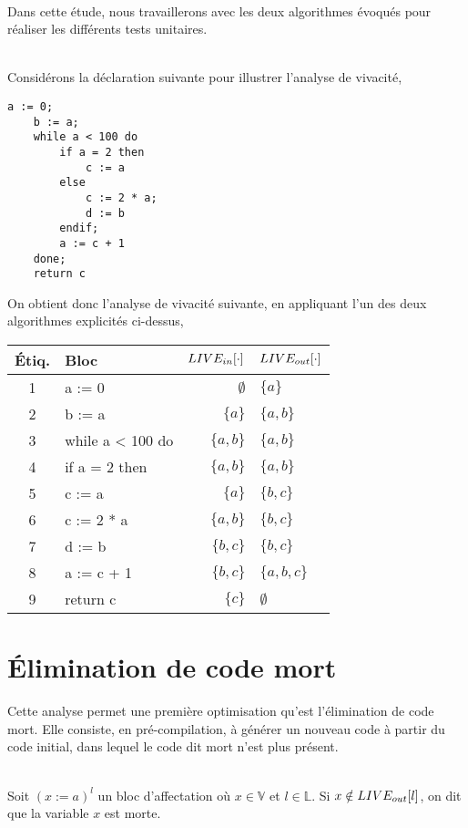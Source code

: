 \documentclass[a4paper, 10pt]{article}
\begin{document}
\\
Dans cette étude, nous travaillerons avec les deux algorithmes évoqués pour réaliser les différents tests unitaires.
\\
\\
\begin{example}
Considérons la déclaration suivante pour illustrer l'analyse de vivacité,
\begin{lstlisting}[tabsize=2]
	a := 0;
	b := a;
	while a < 100 do
		if a = 2 then
			c := a
		else
			c := 2 * a;
			d := b
		endif;
		a := c + 1
	done;
	return c
\end{lstlisting}
On obtient donc l'analyse de vivacité suivante, en appliquant l'un des deux algorithmes explicités ci-dessus,
\\
\begin{center}
	\begin{tabular}{||c|l|r|l||}
	\hline
	Étiq. & Bloc & $LIVE_{in}[\cdot]$ & $LIVE_{out}[\cdot]$ \\
	\hline
	1 & a := 0 & $\emptyset$ & $\{a\}$\\
	2 & b := a & $\{a\}$ & $\{a, b\}$\\
	3 & while a < 100 do & $\{a, b\}$ & $\{a, b\}$\\
	4 & if a = 2 then & $\{a, b\}$ & $\{a, b\}$\\
	5 & c := a & $\{a\}$ & $\{b, c\}$\\
	6 & c := 2 * a & $\{a, b\}$ & $\{b, c\}$\\
	7 & d := b & $\{b, c\}$ & $\{b, c\}$\\
	8 & a := c + 1 & $\{b, c\}$ & $\{a, b, c\}$\\
	9 & return c & $\{c\}$ & $\emptyset$\\
	\hline
	\end{tabular}
\end{center}
\end{example}
\section{Élimination de code mort}
Cette analyse permet une première optimisation qu'est l'élimination de code mort. Elle consiste, en pré-compilation,
à générer un nouveau code à partir du code initial, dans lequel le code dit mort n'est plus présent.
\\
\\
\begin{definition}
	Soit $(x := a)^l$ un bloc d'affectation où $x \in \mathbb{V}$ et $l \in \mathbb{L}$. Si $x \notin LIVE_{out}[l]$, on dit que la variable $x$ est morte.
\end{definition}
\end{document}

